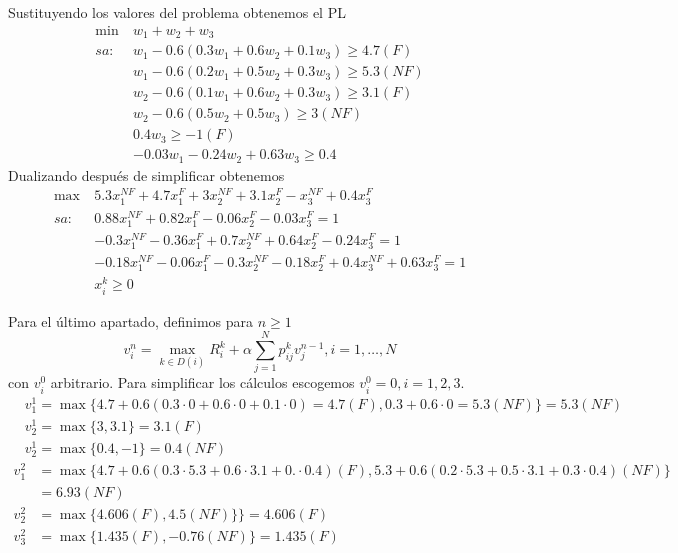 \documentclass[twoside]{article}
\begin{document}
\begin{ejercicio}{2}
\begin{solucion}
Sustituyendo los valores del problema obtenemos el PL
\begin{align*}
\min\ & w_1+w_2+w_3\\
sa: & w_1-0.6(0.3w_1+0.6w_2+0.1w_3)\geq 4.7 (F)\\
    & w_1-0.6(0.2w_1+0.5w_2+0.3w_3)\geq 5.3 (NF)\\
    & w_2-0.6(0.1w_1+0.6w_2+0.3w_3)\geq 3.1 (F)\\
    & w_2-0.6(0.5w_2+0.5w_3)\geq 3 (NF)\\
    & 0.4w_3\geq -1(F)\\
    & -0.03w_1-0.24w_2+0.63w_3\geq 0.4
\end{align*}
Dualizando después de simplificar obtenemos
\begin{align*}
\max\ & 5.3x_1^{NF}+4.7x_1^F+3x_2^{NF}+3.1x_2^F-x_3^{NF}+0.4x_3^F\\
sa:  & 0.88x_1^{NF}+0.82x_1^F-0.06x_2^F-0.03x_3^F=1\\
     & -0.3x_1^{NF}-0.36x_1^F+0.7x_2^{NF}+0.64x_2^F-0.24x_3^F=1\\
     & -0.18x_1^{NF}-0.06x_1^F-0.3x_2^{NF}-0.18x_2^F+0.4x_3^{NF}+0.63x_3^F=1\\
     & x_i^k\geq 0
\end{align*}

Para el último apartado, definimos para $n\geq 1$ $$v_i^n=\max_{k\in D(i)} R_i^k+\alpha\sum_{j=1}^N p_{ij}^k v_j^{n-1}, i=1,\dots, N$$
con $v_i^0$ arbitrario. Para simplificar los cálculos escogemos $v_i^0=0, i=1,2,3$. 
\begin{align*}
& v_1^1=\max\{4.7+0.6(0.3\cdot 0+0.6\cdot0+0.1\cdot 0)=4.7(F), 0.3+0.6\cdot0=5.3(NF)\}=5.3(NF)\\
& v_2^1=\max\{3,3.1\}=3.1(F)\\
& v_2^1=\max\{0.4,-1\}=0.4(NF)
\end{align*}
\begin{align*}
v_1^2&=\max\{4.7+0.6(0.3\cdot 5.3+0.6\cdot 3.1+0.\cdot 0.4)(F),5.3+0.6(0.2\cdot 5.3+0.5\cdot 3.1+0.3\cdot0.4) (NF)\}\\
&=6.93(NF)\\
v_2^2&=\max\{4.606(F),4.5(NF)\}\}=4.606(F)\\
v_3^2&=\max\{1.435(F),-0.76(NF)\}=1.435(F)
\end{align*}
\end{solucion}

\end{ejercicio}

\newpage 
\end{document}

